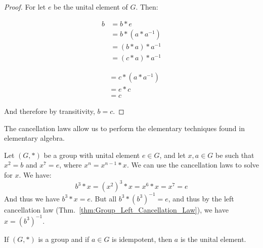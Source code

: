     \begin{proof}
        For let $e$ be the unital element of $G$. Then:
        \par
        \begin{minipage}[t]{0.49\textwidth}
            \centering
            \begin{align}
                b&=b*e
                \tag{Identity}\\
                &=b*(a*a^{\minus{1}})
                \tag{Inverse}\\
                &=(b*a)*a^{\minus{1}}
                \tag{Associativity}\\
                &=(c*a)*a^{\minus{1}}
                \tag{Hypothesis}
            \end{align}
        \end{minipage}
        \hfill
        \begin{minipage}[t]{0.49\textwidth}
            \centering
            \begin{align}
                &=c*(a*a^{\minus{1}})
                \tag{Associativity}\\
                &=e*c
                \tag{Inverse}\\
                &=c
                \tag{Identity}
            \end{align}
        \end{minipage}
        \par\vspace{2.5ex}
        And therefore by transitivity, $b=c$.
    \end{proof}
    The cancellation laws allow us to perform the elementary techniques found
    in elementary algebra.
    \begin{example}
        Let $(G,*)$ be a group with unital element $e\in{G}$, and let
        $x,a\in{G}$ be such that $x^{2}=b$ and $x^{7}=e$, where
        $x^{n}=x^{n-1}*x$. We can use the cancellation laws to solve for $x$.
        We have:
        \begin{equation}
            b^{3}*x=(x^{2})^{3}*x=x^{6}*x=x^{7}=e
        \end{equation}
        And thus we have $b^{3}*x=e$. But all $b^{3}*(b^{3})^{\minus{1}}=e$, and
        thus by the left cancellation law
        (Thm.~\ref{thm:Group_Left_Cancellation_Law}), we have
        $x=(b^{3})^{\minus{1}}$.
    \end{example}
    \begin{theorem}
        If $(G,*)$ is a group and if $a\in{G}$ is idempotent, then $a$ is the
        unital element.
    \end{theorem}
